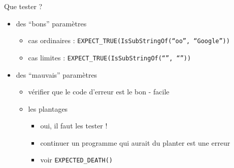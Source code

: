 \begin{frame}{Que tester ?}

\begin{itemize}
\itemsep1pt\parskip0pt
\item
  des ``bons'' paramètres

  \begin{itemize}
  \itemsep1pt\parskip0pt
  \item
    cas ordinaires : \texttt{EXPECT\_TRUE(IsSubStringOf(``oo'', ``Google''))}
  \item
    cas limites : \texttt{EXPECT\_TRUE(IsSubStringOf(``'', ``''))}
  \end{itemize}
\item
  des ``mauvais'' paramètres

  \begin{itemize}
  \itemsep1pt\parskip0pt
  \item
    vérifier que le code d'erreur est le bon - facile
  \item
    les plantages

    \begin{itemize}
    \itemsep1pt\parskip0pt
    \item
      oui, il faut les tester !
    \item
      continuer un programme qui aurait du planter est une erreur

      \item
        voir \texttt{EXPECTED\_DEATH()}
    \end{itemize}
  \end{itemize}
\end{itemize}

\end{frame}


